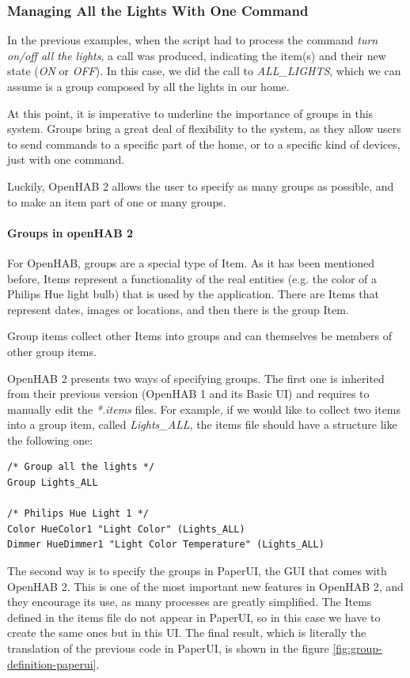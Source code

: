 \subsubsection{Managing All the Lights With One Command}
In the previous examples, when the script had to process the command \textit{turn on/off all the lights}, a call was produced, indicating
the item(s) and their new state (\textit{ON} or \textit{OFF}). In this case, we did the call to \textit{ALL\_LIGHTS}, which we can
assume is a group composed by all the lights in our home.

At this point, it is imperative to underline the importance of groups in this system. Groups bring a great deal of flexibility to the system,
as they allow users to send commands to a specific part of the home, or to a specific kind of devices, just with one command.

Luckily, OpenHAB 2 allows the user to specify as many groups as possible, and to make an item part of one or many groups.

\paragraph{Groups in openHAB 2}
For OpenHAB, groups are a special type of Item. As it has been mentioned before, Items represent a functionality of the real entities
(e.g. the color of a Philips Hue light bulb) that is used by the application. There are Items that represent dates, images or locations,
and then there is the group Item.

Group items collect other Items into groups and can themselves be members of other group items.

OpenHAB 2 presents two ways of specifying groups. The first one is inherited from their previous version (OpenHAB 1 and its Basic
UI) and requires to manually edit the \textit{*.items} files. For example, if we would like to collect two items into a group item,
called \textit{Lights\_ALL}, the items file should have a structure like the following one:

\begin{lstlisting}[style=Consola]
/* Group all the lights */
Group Lights_ALL

/* Philips Hue Light 1 */
Color HueColor1 "Light Color" (Lights_ALL)
Dimmer HueDimmer1 "Light Color Temperature" (Lights_ALL)
\end{lstlisting}

The second way is to specify the groups in PaperUI, the GUI that comes with OpenHAB 2. This is one of the most important new features
in OpenHAB 2, and they encourage its use, as many processes are greatly simplified. The Items defined in the items file do not
appear in PaperUI, so in this case we have to create the same ones but in this UI. The final result, which is literally the translation
of the previous code in PaperUI, is shown in the figure \ref{fig:group-definition-paperui}.

